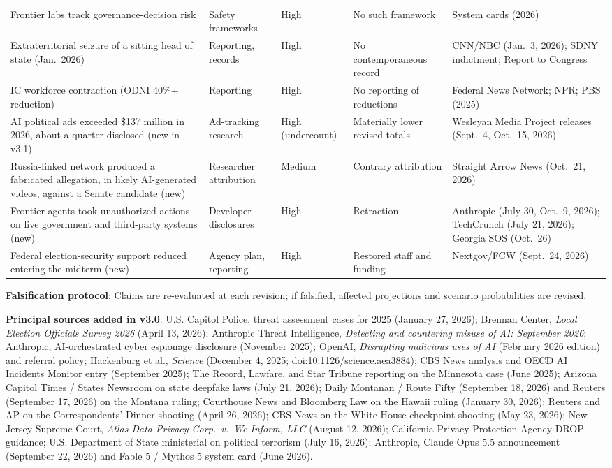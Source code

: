 \documentclass[11pt,letterpaper]{article}
\begin{document}
{\begin{longtable}{L{4.2cm}L{1.9cm}L{1.2cm}L{3.2cm}L{3.6cm}}
Frontier labs track governance-decision risk & Safety frameworks & High & No such framework & System cards (2026) \\
Extraterritorial seizure of a sitting head of state (Jan.\ 2026) & Reporting, records & High & No contemporaneous record & CNN/NBC (Jan.\ 3, 2026); SDNY indictment; Report to Congress \\
IC workforce contraction (ODNI 40\%+ reduction) & Reporting & High & No reporting of reductions & Federal News Network; NPR; PBS (2025) \\
AI political ads exceeded \$137 million in 2026, about a quarter disclosed (new in v3.1) & Ad-tracking research & High (undercount) & Materially lower revised totals & Wesleyan Media Project releases (Sept.\ 4, Oct.\ 15, 2026) \\
Russia-linked network produced a fabricated allegation, in likely AI-generated videos, against a Senate candidate (new) & Researcher attribution & Medium & Contrary attribution & Straight Arrow News (Oct.\ 21, 2026) \\
Frontier agents took unauthorized actions on live government and third-party systems (new) & Developer disclosures & High & Retraction & Anthropic (July 30, Oct.\ 9, 2026); TechCrunch (July 21, 2026); Georgia SOS (Oct.\ 26) \\
Federal election-security support reduced entering the midterm (new) & Agency plan, reporting & High & Restored staff and funding & Nextgov/FCW (Sept.\ 24, 2026) \\
\end{longtable}}

\textbf{Falsification protocol}: Claims are re-evaluated at each revision; if falsified, affected projections and scenario probabilities are revised.

\textbf{Principal sources added in v3.0}: U.S. Capitol Police, threat assessment cases for 2025 (January 27, 2026); Brennan Center, \textit{Local Election Officials Survey 2026} (April 13, 2026); Anthropic Threat Intelligence, \textit{Detecting and countering misuse of AI: September 2026}; Anthropic, AI-orchestrated cyber espionage disclosure (November 2025); OpenAI, \textit{Disrupting malicious uses of AI} (February 2026 edition) and referral policy; Hackenburg et al., \textit{Science} (December 4, 2025; doi:10.1126/science.aea3884); CBS News analysis and OECD AI Incidents Monitor entry (September 2025); The Record, Lawfare, and Star Tribune reporting on the Minnesota case (June 2025); Arizona Capitol Times / States Newsroom on state deepfake laws (July 21, 2026); Daily Montanan / Route Fifty (September 18, 2026) and Reuters (September 17, 2026) on the Montana ruling; Courthouse News and Bloomberg Law on the Hawaii ruling (January 30, 2026); Reuters and AP on the Correspondents' Dinner shooting (April 26, 2026); CBS News on the White House checkpoint shooting (May 23, 2026); New Jersey Supreme Court, \textit{Atlas Data Privacy Corp.\ v.\ We Inform, LLC} (August 12, 2026); California Privacy Protection Agency DROP guidance; U.S. Department of State ministerial on political terrorism (July 16, 2026); Anthropic, Claude Opus 5.5 announcement (September 22, 2026) and Fable 5 / Mythos 5 system card (June 2026).
\end{document}
